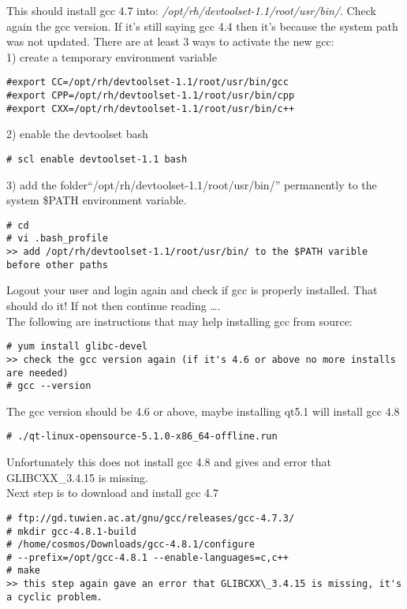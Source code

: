 \documentclass{article}
\begin{document}
This should install gcc 4.7 into: \textit{/opt/rh/devtoolset-1.1/root/usr/bin/}. Check again the gcc version. If it's still saying gcc 4.4 then it's because the system path was not updated. There are at least 3 ways to activate the new gcc: \\

1) create a temporary environment variable
\begin{lstlisting}[style=BashInputStyle]
#export CC=/opt/rh/devtoolset-1.1/root/usr/bin/gcc  
#export CPP=/opt/rh/devtoolset-1.1/root/usr/bin/cpp
#export CXX=/opt/rh/devtoolset-1.1/root/usr/bin/c++
\end{lstlisting}

2) enable the devtoolset bash
\begin{lstlisting}[style=BashInputStyle]
# scl enable devtoolset-1.1 bash
\end{lstlisting}

3) add the folder``/opt/rh/devtoolset-1.1/root/usr/bin/'' permanently to the system \$PATH environment variable.
\begin{lstlisting}[style=BashInputStyle]
# cd
# vi .bash_profile
>> add /opt/rh/devtoolset-1.1/root/usr/bin/ to the $PATH varible before other paths
\end{lstlisting}

Logout your user and login again and check if gcc is properly installed. That should do it! If not then continue reading \dots. \\

The following are instructions that may help installing gcc from source:

\begin{lstlisting}[style=BashInputStyle]
# yum install glibc-devel
>> check the gcc version again (if it's 4.6 or above no more installs are needed)
# gcc --version
\end{lstlisting}
	

The gcc version should be 4.6 or above, maybe installing qt5.1 will install gcc 4.8

\begin{lstlisting}[style=BashInputStyle]
# ./qt-linux-opensource-5.1.0-x86_64-offline.run
\end{lstlisting}
Unfortunately this does not install gcc 4.8 and gives and error that GLIBCXX\_3.4.15 is missing. \\

Next step is to download and install gcc 4.7
\begin{lstlisting}[style=BashInputStyle]
# ftp://gd.tuwien.ac.at/gnu/gcc/releases/gcc-4.7.3/
# mkdir gcc-4.8.1-build
# /home/cosmos/Downloads/gcc-4.8.1/configure 
# --prefix=/opt/gcc-4.8.1 --enable-languages=c,c++
# make
>> this step again gave an error that GLIBCXX\_3.4.15 is missing, it's a cyclic problem.
\end{lstlisting}
	
\end{document}
